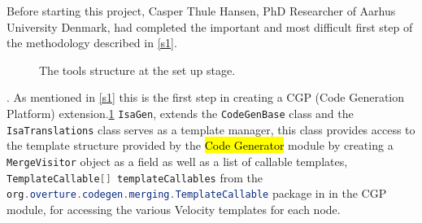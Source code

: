 	Before starting this project, Casper Thule Hansen, PhD Researcher of Aarhus University Denmark\parencite{casper}, had completed the important and most difficult first step of the methodology described in \ref{s1}.\parencite{VDM2ISAGit}
	\begin{figure}
        \caption{\label{fig:toolStructure} The tools structure at the set up stage. \parencite{vdmwikiast}}
     \end{figure}.
    As mentioned in \ref{s1} this is the first step in creating a CGP (Code Generation Platform) extension.\ref{fig:toolStructure} \lstinline[language=Java]{IsaGen}, extends the \lstinline[language=Java]{CodeGenBase} class and the \lstinline[language=Java]{IsaTranslations} class serves as a template manager, this class provides access to the template structure provided by the \ttfamily\hl{Code Generator} \rmfamily module by creating a \lstinline[language=Java]{MergeVisitor} object as a field as well as a list of callable templates, \lstinline[language=Java]{TemplateCallable[] templateCallables} from the \lstinline[language=Java]{org.overture.codegen.merging.TemplateCallable} package in in the CGP module, for accessing the various Velocity templates for each node.

